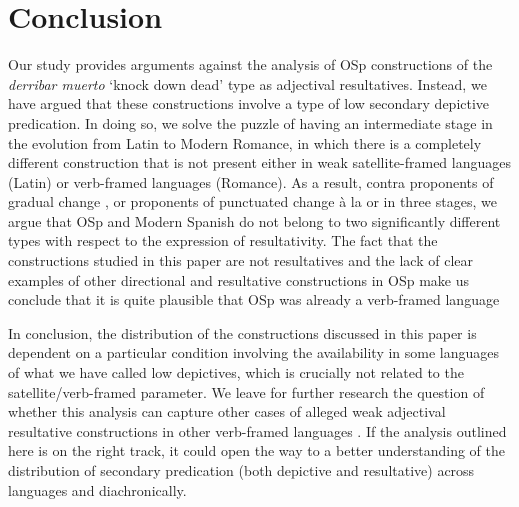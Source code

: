 \documentclass[output=paper,colorlinks,citecolor=brown,
]{langscibook}
\begin{document}
\section{Conclusion}\label{sec:acedomatellan:6}

Our study provides arguments against the analysis of OSp constructions of the \emph{derribar muerto} `knock down dead' type as adjectival resultatives. Instead, we have argued that these constructions involve a type of low secondary depictive predication.  In doing so, we solve the puzzle of having an intermediate stage in the evolution from Latin to Modern Romance, in which there is a completely different construction that is not present either in weak satellite-framed languages (Latin) or verb-framed languages (Romance). As a result, contra proponents of gradual change \citep{stolova2008satellite,kopecka2009continuity,iacobini2011diachronic}, or proponents of punctuated change à la \citet{trobergburnett} or \citet{troberg2014predicat} in three stages, we argue that OSp and Modern Spanish do not belong to two significantly different types with respect to the expression of resultativity. The fact that the constructions studied in this paper  are not resultatives and the lack of clear examples of other directional and resultative constructions in OSp make us conclude that it is quite plausible that OSp was already a verb-framed language 


In conclusion, the distribution of the constructions discussed in this paper is dependent on a particular condition involving the availability in some languages of what we have called low depictives, which is crucially not related to the satellite/verb-framed parameter. We leave for further research the question of whether this analysis can capture other cases of alleged weak adjectival resultative constructions in other verb-framed languages \citep{Washio1997}. If the analysis outlined here is on the right track, it could open the way to a better understanding of the distribution of secondary predication (both depictive and resultative) across languages and diachronically.
\end{document}
